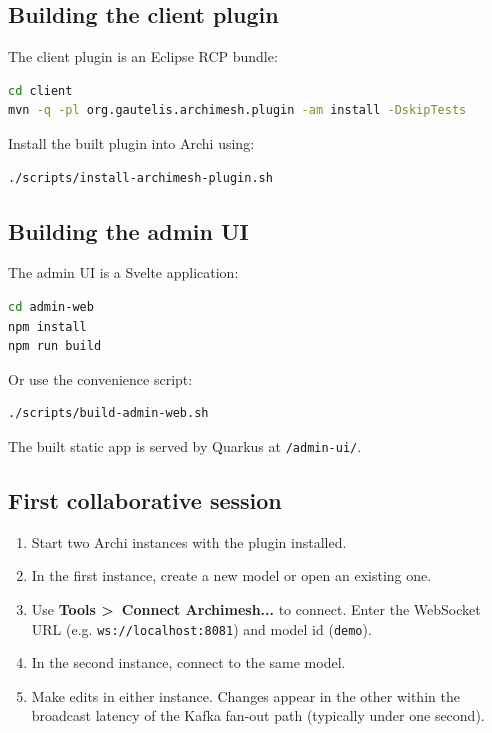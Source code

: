 \subsection{Building the client plugin}

The client plugin is an Eclipse RCP bundle:

\begin{lstlisting}[language=bash,caption={Build client plugin}]
cd client
mvn -q -pl org.gautelis.archimesh.plugin -am install -DskipTests
\end{lstlisting}

Install the built plugin into Archi using:

\begin{lstlisting}[language=bash,caption={Install plugin}]
./scripts/install-archimesh-plugin.sh
\end{lstlisting}

\subsection{Building the admin UI}

The admin UI is a Svelte application:

\begin{lstlisting}[language=bash,caption={Build admin UI}]
cd admin-web
npm install
npm run build
\end{lstlisting}

Or use the convenience script:

\begin{lstlisting}[language=bash,caption={Build admin UI via script}]
./scripts/build-admin-web.sh
\end{lstlisting}

The built static app is served by Quarkus at \texttt{/admin-ui/}.

\subsection{First collaborative session}

\begin{enumerate}
\item Start two Archi instances with the plugin installed.
\item In the first instance, create a new model or open an existing one.
\item Use \textbf{Tools \textgreater\ Connect Archimesh...} to connect.
  Enter the WebSocket URL (e.g. \texttt{ws://localhost:8081}) and model id
  (\texttt{demo}).
\item In the second instance, connect to the same model.
\item Make edits in either instance. Changes appear in the other within the
  broadcast latency of the Kafka fan-out path (typically under one second).
\end{enumerate}

